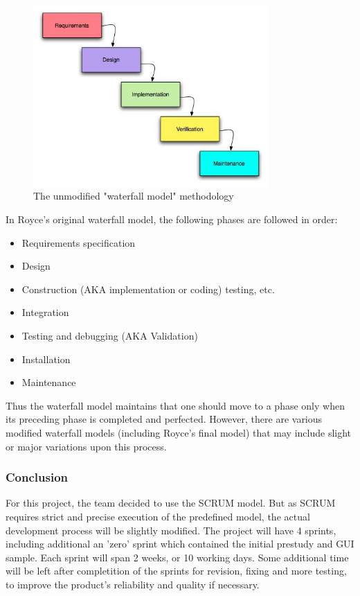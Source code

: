 \begin{figure}[htb]
	\centering
	\includegraphics[width=0.8\textwidth]{process/development_process/waterfall.jpg}
	\caption{The unmodified "waterfall model" methodology\cite{worldpress:waterfall}}
	\label{fig:waterfall-model}
\end{figure}

In Royce's original waterfall model, the following phases are followed in order:

\begin{itemize}
	\item Requirements specification
	\item Design
	\item Construction (AKA implementation or coding) testing, etc.
	\item Integration
	\item Testing and debugging (AKA Validation)
	\item Installation
	\item Maintenance
\end{itemize}

Thus the waterfall model maintains that one should move to a phase only when its preceding phase is 
completed and perfected. However, there are various modified waterfall models (including Royce's final model) 
that may include slight or major variations upon this process.

\subsubsection{Conclusion}
For this project, the team decided to use the SCRUM model. But as SCRUM requires strict and precise
execution of the predefined model, the actual development process will be slightly modified. 
The project will have 4 sprints, including additional an 'zero' sprint which contained the initial
prestudy and GUI sample. Each sprint will span 2 weeks, or 10 working days. 
Some additional time will be left after completition of the sprints for revision, 
fixing and more testing, to improve the product's reliability and quality if necessary.
